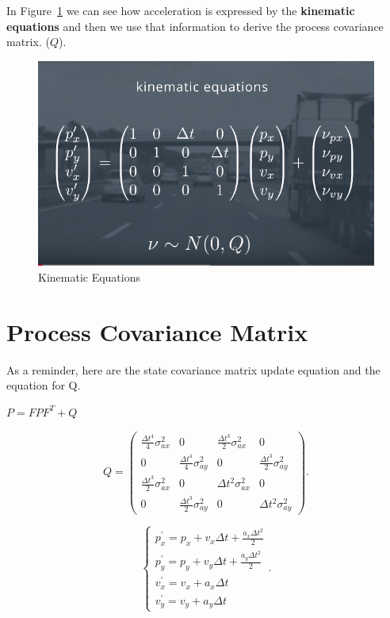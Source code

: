 \documentclass[11pt, a4paper]{article}
\begin{document}
In Figure~\ref{fig:kinematic_eq} we can see how acceleration is expressed by the \textbf{kinematic equations} and then we use that information to derive the process covariance matrix. ($Q$).
\begin{figure}[htpb!]
	\centering
	\includegraphics[width=0.8\linewidth]{kinematic_eq}
	\caption{Kinematic Equations}
	\label{fig:kinematic_eq}
\end{figure}


\section{Process Covariance Matrix}%
\label{sec:process_covariance_matrix}


As a reminder, here are the state covariance matrix update equation and the equation for Q.


$ P = FPF^T + Q $

\[
Q=\left(\begin{array}{cccc}{\frac{\Delta t^{4}}{4} \sigma_{a x}^{2}} & {0} & {\frac{\Delta t^{3}}{2} \sigma_{a x}^{2}} & {0} \\ {0} & {\frac{\Delta t^{4}}{4} \sigma_{a y}^{2}} & {0} & {\frac{\Delta t^{3}}{2} \sigma_{a y}^{2}} \\ {\frac{\Delta t^{3}}{2} \sigma_{a x}^{2}} & {0} & {\Delta t^{2} \sigma_{a x}^{2}} & {0} \\ {0} & {\frac{\Delta t^{3}}{2} \sigma_{a y}^{2}} & {0} & {\Delta t^{2} \sigma_{a y}^{2}}\end{array}\right)
.\] 


\[
	\left\{\begin{array}{l}{p_{x}^{\prime}=p_{x}+v_{x} \Delta t+\frac{a_{x} \Delta t^{2}}{2}} \\ 
	{p_{y}^{\prime}=p_{y}+v_{y} \Delta t+\frac{a_{y} \Delta t^{2}}{2}} \\ {v_{x}^{\prime}=v_{x}+a_{x} \Delta t} \\ {v_{y}^{\prime}=v_{y}+a_{y} \Delta t}\end{array}\right.
.\] 
\end{document}
